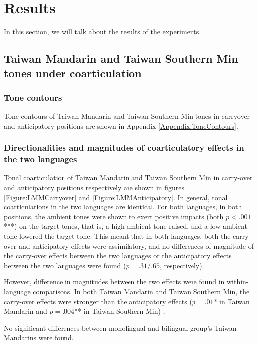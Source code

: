 
\chapter{Results}\label{chapter:Results}

In this section, we will talk about the results of the experiments.

\section{Taiwan Mandarin and Taiwan Southern Min tones under coarticulation}

\subsection{Tone contours}

Tone contours of Taiwan Mandarin and Taiwan Southern Min tones in carryover and anticipatory positions are shown in Appendix \ref{Appendix:ToneContours}.

\subsection{Directionalities and magnitudes of coarticulatory effects in the two languages}

Tonal coarticulation of Taiwan Mandarin and Taiwan Southern Min in carry-over and anticipatory positions respectively are shown in figures \ref{Figure:LMMCarryover} and \ref{Figure:LMMAnticipatory}. In general, tonal coarticulations in the two languages are identical. For both languages, in both positions, the ambient tones were shown to exert positive impacts (both $p<.001$***) on the target tones, that is, a high ambient tone raised, and a low ambient tone lowered the target tone. This meant that in both languages, both the carry-over and anticipatory effects were assimilatory, and no differences of magnitude of the carry-over effects between the two languages or the anticipatory effects between the two languages were found ($p=.31/.65$, respectively).

However, difference in magnitudes between the two effects were found in within-language comparisons. In both Taiwan Mandarin and Taiwan Southern Min, the carry-over effects were stronger than the anticipatory effects ($p=.01$* in Taiwan Mandarin and $p=.004$** in Taiwan Southern Min) .

No significant differences between monolingual and bilingual group's Taiwan Mandarins were found.

